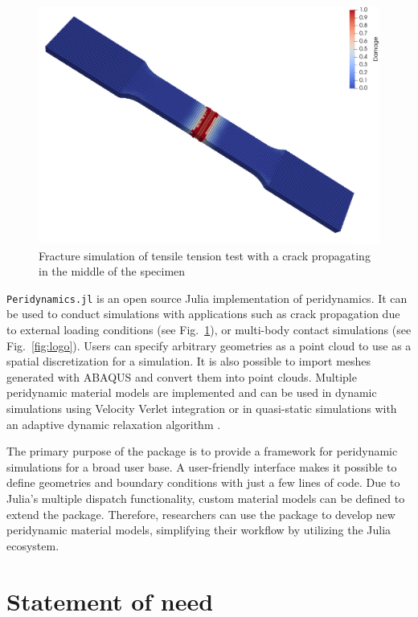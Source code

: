 \documentclass{juliacon}
\begin{document}
\begin{figure}
\centerline{\includegraphics[width=0.9\linewidth]{tensile_test.png}}
\caption{Fracture simulation of tensile tension test with a crack propagating in the middle of the specimen}
\label{fig:tensiletest}
\end{figure}

\texttt{Peridynamics.jl} is an open source Julia \cite{Bezanson2017julia} implementation of peridynamics.
It can be used to conduct simulations with applications such as crack propagation due to external loading conditions (see Fig.~\ref{fig:tensiletest}), or multi-body contact simulations (see Fig.~\ref{fig:logo}).
Users can specify arbitrary geometries as a point cloud to use as a spatial discretization for a simulation.
It is also possible to import meshes generated with ABAQUS and convert them into point clouds.
Multiple peridynamic material models are implemented and can be used in dynamic simulations using Velocity Verlet integration or in quasi-static simulations with an adaptive dynamic relaxation algorithm \cite{Kilic2010}.

The primary purpose of the package is to provide a framework for peridynamic simulations for a broad user base.
A user-friendly interface makes it possible to define geometries and boundary conditions with just a few lines of code.
Due to Julia's multiple dispatch functionality, custom material models can be defined to extend the package.
Therefore, researchers can use the package to develop new peridynamic material models, simplifying their workflow by utilizing the Julia ecosystem.

\section{Statement of need}
\end{document}
